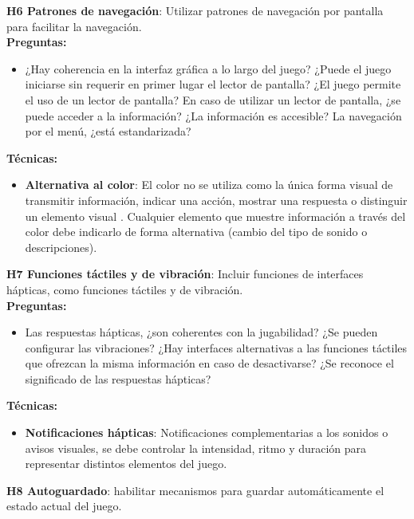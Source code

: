 \textbf{H6 Patrones de navegación}: Utilizar patrones de navegación por pantalla para facilitar la navegación. \cite{araujoMobileAudioGames2017a} \cite{deborbacamposUsabilityAccessibilityGameplay2016} \cite{teixeiraborgesFairPlayGuidelines2018a}\\
\textbf{Preguntas:}
\begin{itemize}
	\item ¿Hay coherencia en la interfaz gráfica a lo largo del juego? ¿Puede el juego iniciarse sin requerir en primer lugar el lector de pantalla? ¿El juego permite el uso de un lector de pantalla?  En caso de utilizar un lector de pantalla, ¿se puede acceder a la información? ¿La información es accesible? La navegación por el menú, ¿está estandarizada?
\end{itemize}
\textbf{Técnicas:}
\begin{itemize}
	\item \textbf{Alternativa al color}: El color no se utiliza como la única forma visual de transmitir información, indicar una acción, mostrar una respuesta o distinguir un elemento visual \cite{WebContentAccessibility}. Cualquier elemento que muestre información a través del color debe indicarlo de forma alternativa (cambio del tipo de sonido o descripciones). \cite{LibroBlancoAccesibilidad} 
\end{itemize}
 \textbf{H7 Funciones táctiles y de vibración}: Incluir funciones de interfaces hápticas, como funciones táctiles y de vibración. \cite{darinPrinciplesEvaluatingUsability2019} \cite{teixeiraborgesFairPlayGuidelines2018a}\\
 \textbf{Preguntas:}
 \begin{itemize}
 	\item Las respuestas hápticas, ¿son coherentes con la jugabilidad? ¿Se pueden configurar las vibraciones? ¿Hay interfaces alternativas a las funciones táctiles que ofrezcan la misma información en caso de desactivarse? ¿Se reconoce el significado de las respuestas hápticas?
 \end{itemize}
 \textbf{Técnicas:}
 \begin{itemize}
 	\item \textbf{Notificaciones hápticas}: Notificaciones complementarias a los sonidos o avisos visuales, se debe controlar la intensidad, ritmo y duración para representar distintos elementos del juego. \cite{LibroBlancoAccesibilidad}
 \end{itemize}
  \textbf{H8 Autoguardado}: habilitar mecanismos para guardar automáticamente el estado actual del juego. \cite{teixeiraborgesFairPlayGuidelines2018a}\\
